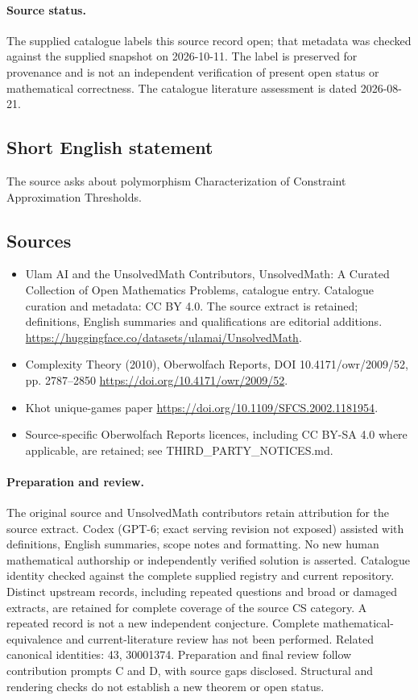 \documentclass[11pt]{article}
\begin{document}
\paragraph{Source status.}
The supplied catalogue labels this source record open; that metadata was checked against the supplied snapshot on 2026-10-11. The label is preserved for provenance and is not an independent verification of present open status or mathematical correctness. The catalogue literature assessment is dated 2026-08-21.
\subsection{Short English statement}
The source asks about polymorphism Characterization of Constraint Approximation Thresholds.
\subsection{Sources}
\begin{itemize}
\item[\hypertarget{source:statement:1}{S1}] Ulam AI and the UnsolvedMath Contributors, UnsolvedMath: A Curated Collection of Open Mathematics Problems, catalogue entry. Catalogue curation and metadata: CC BY 4.0. The source extract is retained; definitions, English summaries and qualifications are editorial additions.
\url{https://huggingface.co/datasets/ulamai/UnsolvedMath}.
\item[\hypertarget{source:statement:2}{S2}] Complexity Theory (2010), Oberwolfach Reports, DOI 10.4171/owr/2009/52, pp. 2787--2850
\url{https://doi.org/10.4171/owr/2009/52}.
\item[\hypertarget{source:statement:3}{S3}] Khot unique-games paper
\url{https://doi.org/10.1109/SFCS.2002.1181954}.
\item Source-specific Oberwolfach Reports licences, including CC BY-SA 4.0 where applicable, are retained; see THIRD\_PARTY\_NOTICES.md.
\end{itemize}
\paragraph{Preparation and review.}
The original source and UnsolvedMath contributors retain attribution for the source extract. Codex (GPT-6; exact serving revision not exposed) assisted with definitions, English summaries, scope notes and formatting. No new human mathematical authorship or independently verified solution is asserted. Catalogue identity checked against the complete supplied registry and current repository. Distinct upstream records, including repeated questions and broad or damaged extracts, are retained for complete coverage of the source CS category. A repeated record is not a new independent conjecture. Complete mathematical-equivalence and current-literature review has not been performed. Related canonical identities: 43, 30001374. Preparation and final review follow contribution prompts C and D, with source gaps disclosed. Structural and rendering checks do not establish a new theorem or open status.
\label{end:statement}
\end{document}
